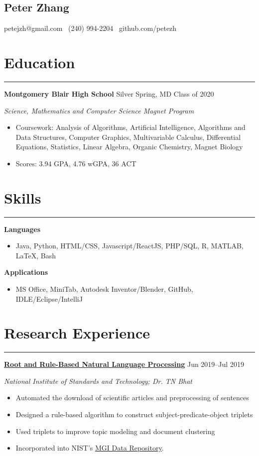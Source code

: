 \documentclass[11pt]{article}
\newcommand{\name}[1]{\begin{center}\section*{\huge \color{highlight} #1}\end{center}}
\newcommand{\topinfo}[1]{\begin{center}\vspace{-0.2cm}#1\vspace{-0.2cm}\end{center}}
\newcommand{\resumesection}[1]{\vspace{-0.3cm}\section*{\color{highlight}#1}\vspace{-0.3cm}\hrule\vspace{0.3cm}}
\begin{document}
\name{Peter Zhang}
\topinfo{petejzh@gmail.com \textbullet\ (240) 994-2204 \textbullet\ github.com/petezh}

\resumesection{Education}

\textbf{Montgomery Blair High School} Silver Spring, MD \hfill Class of 2020 \par
\textit{Science, Mathematics and Computer Science Magnet Program}

\begin{itemize}
	\item Coursework: Analysis of Algorithms, Artificial Intelligence, Algorithms and Data Structures, Computer Graphics, Multivariable Calculus, Differential Equations, Statistics, Linear Algebra, Organic Chemistry, Magnet Biology
	\item Scores: 3.94 GPA, 4.76 wGPA,  36 ACT
\end{itemize}


\resumesection{Skills}

\textbf{Languages}
\begin{itemize} 
	\item Java, Python, HTML/CSS, Javascript/ReactJS, PHP/SQL, R, MATLAB, \LaTeX, Bash
\end{itemize}\vspace{0.1cm}

\textbf{Applications}
\begin{itemize} 
	\item MS Office, MiniTab, Autodesk Inventor/Blender, GitHub, IDLE/Eclipse/IntelliJ
\end{itemize}

\resumesection{Research Experience}

\textbf{\href{https://github.com/petezh/Root-and-Rule-NLP}{Root and Rule-Based Natural Language Processing}} \hfill Jun 2019--Jul 2019\par
\textit{National Institute of Standards and Technology; Dr. TN Bhat}
\begin{itemize}
	\item Automated the download of scientific articles and preprocessing of sentences
	\item Designed a rule-based algorithm to construct subject-predicate-object triplets
	\item Used triplets to improve topic modeling and document clustering
	\item Incorporated into NIST's \href{https://randr.nist.gov/mgi/default.aspx}{MGI Data Repository}.
\end{itemize}\vspace{0.1cm}
\end{document}
